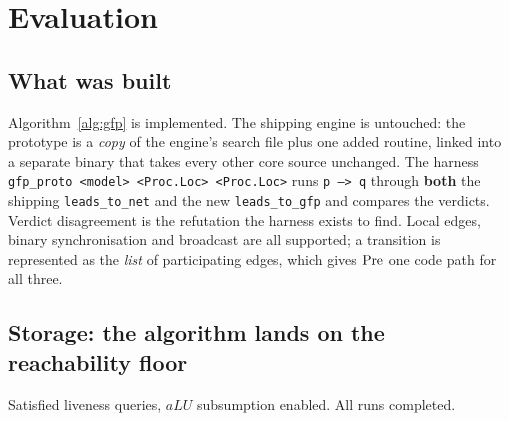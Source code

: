 \section{Evaluation}
\label{sec:eval}

\subsection{What was built}

Algorithm~\ref{alg:gfp} is implemented. The shipping engine is untouched: the prototype is a
\emph{copy} of the engine's search file plus one added routine, linked into a separate binary that
takes every other core source unchanged. The harness \texttt{gfp\_proto <model> <Proc.Loc>
<Proc.Loc>} runs \texttt{p --> q} through \textbf{both} the shipping \texttt{leads\_to\_net} and the
new \texttt{leads\_to\_gfp} and compares the verdicts. Verdict disagreement is the refutation the
harness exists to find. Local edges, binary synchronisation and broadcast are all supported; a
transition is represented as the \emph{list} of participating edges, which gives $\mathrm{Pre}$ one code
path for all three.

\subsection{Storage: the algorithm lands on the reachability floor}

Satisfied liveness queries, $aLU$ subsumption enabled. All runs completed.


